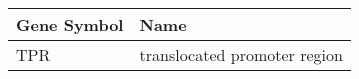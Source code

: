 \begin{tabular}{ll}
\toprule
Gene Symbol &                         Name \\
\midrule
        TPR & translocated promoter region \\
\bottomrule
\end{tabular}
